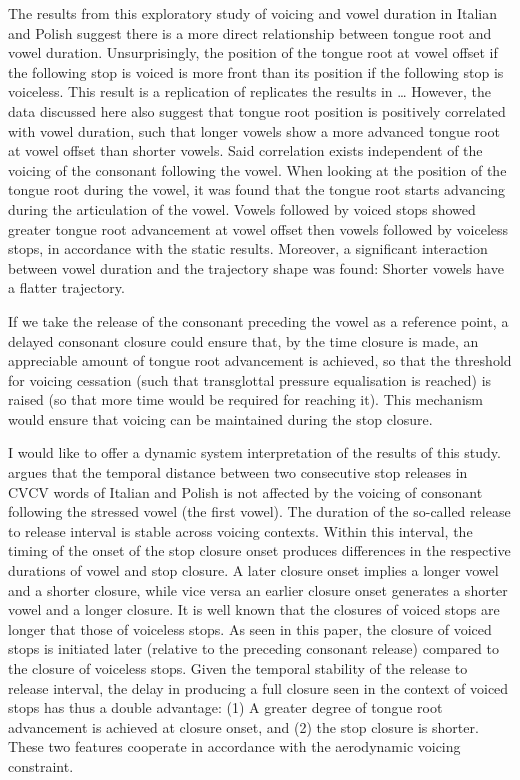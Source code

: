 \documentclass[12pt,]{article}
\begin{document}
The results from this exploratory study of voicing and vowel duration in
Italian and Polish suggest there is a more direct relationship between
tongue root and vowel duration. Unsurprisingly, the position of the
tongue root at vowel offset if the following stop is voiced is more
front than its position if the following stop is voiceless. This result
is a replication of replicates the results in \ldots{} However, the data
discussed here also suggest that tongue root position is positively
correlated with vowel duration, such that longer vowels show a more
advanced tongue root at vowel offset than shorter vowels. Said
correlation exists independent of the voicing of the consonant following
the vowel. When looking at the position of the tongue root during the
vowel, it was found that the tongue root starts advancing during the
articulation of the vowel. Vowels followed by voiced stops showed
greater tongue root advancement at vowel offset then vowels followed by
voiceless stops, in accordance with the static results. Moreover, a
significant interaction between vowel duration and the trajectory shape
was found: Shorter vowels have a flatter trajectory.

If we take the release of the consonant preceding the vowel as a
reference point, a delayed consonant closure could ensure that, by the
time closure is made, an appreciable amount of tongue root advancement
is achieved, so that the threshold for voicing cessation (such that
transglottal pressure equalisation is reached) is raised (so that more
time would be required for reaching it). This mechanism would ensure
that voicing can be maintained during the stop closure.

I would like to offer a dynamic system interpretation of the results of
this study. \citet{coretta2018j} argues that the temporal distance
between two consecutive stop releases in CVCV words of Italian and
Polish is not affected by the voicing of consonant following the
stressed vowel (the first vowel). The duration of the so-called release
to release interval is stable across voicing contexts. Within this
interval, the timing of the onset of the stop closure onset produces
differences in the respective durations of vowel and stop closure. A
later closure onset implies a longer vowel and a shorter closure, while
vice versa an earlier closure onset generates a shorter vowel and a
longer closure. It is well known that the closures of voiced stops are
longer that those of voiceless stops. As seen in this paper, the closure
of voiced stops is initiated later (relative to the preceding consonant
release) compared to the closure of voiceless stops. Given the temporal
stability of the release to release interval, the delay in producing a
full closure seen in the context of voiced stops has thus a double
advantage: (1) A greater degree of tongue root advancement is achieved
at closure onset, and (2) the stop closure is shorter. These two
features cooperate in accordance with the aerodynamic voicing
constraint.
\end{document}
